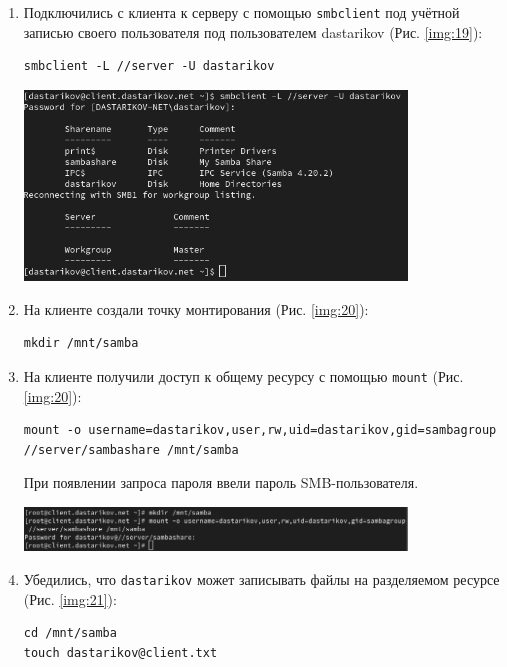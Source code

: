 \begin{enumerate}
\item Подключились с клиента к серверу с помощью {\tt smbclient} под учётной записью своего пользователя под пользователем dastarikov (Рис. \ref{img:19}):
    \begin{verbatim}
smbclient -L //server -U dastarikov
    \end{verbatim}

\begin{center}
    \centering
    \includegraphics[width=0.8\textwidth]{../images/image19.png}
    \label{img:19}
\end{center}

\item На клиенте создали точку монтирования (Рис. \ref{img:20}):
    \begin{verbatim}
mkdir /mnt/samba
    \end{verbatim}
\item На клиенте получили доступ к общему ресурсу с помощью {\tt mount} (Рис. \ref{img:20}):
    \begin{verbatim}
mount -o username=dastarikov,user,rw,uid=dastarikov,gid=sambagroup //server/sambashare /mnt/samba
    \end{verbatim}
При появлении запроса пароля ввели пароль SMB-пользователя.

\begin{center}
    \centering
    \includegraphics[width=0.8\textwidth]{../images/image20.png}
    \label{img:20}
\end{center}

\item Убедились, что {\tt dastarikov} может записывать файлы на разделяемом ресурсе (Рис. \ref{img:21}):
    \begin{verbatim}
cd /mnt/samba
touch dastarikov@client.txt
    \end{verbatim}


\end{enumerate}
